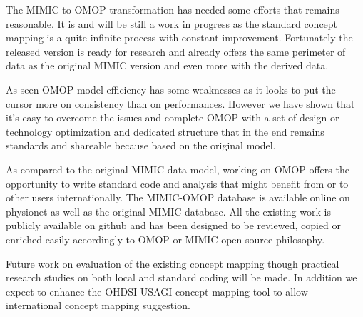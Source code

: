 The MIMIC to OMOP transformation has needed some efforts that remains
reasonable. It is and will be still a work in progress as the standard concept
mapping is a quite infinite process with constant improvement. Fortunately the
released version is ready for research and already offers the same perimeter of
data as the original MIMIC version and even more with the derived data.

As seen OMOP model efficiency has some weaknesses as it looks to put the cursor
more on consistency than on performances. However we have shown that it's easy
to overcome the issues and complete OMOP with a set of design or technology
optimization and dedicated structure that in the end remains standards and
shareable because based on the original model.

As compared to the original MIMIC data model, working on OMOP offers the
opportunity to write standard code and analysis that might benefit from or to
other users internationally. The MIMIC-OMOP database is available online on
physionet as well as the original MIMIC database. All the existing work is
publicly available on github and has been designed to be reviewed, copied or
enriched easily accordingly to OMOP or MIMIC open-source philosophy.

Future work on evaluation of the existing concept mapping though practical
research studies on both local and standard coding will be made. In addition we
expect to enhance the OHDSI USAGI concept mapping tool to allow international
concept mapping suggestion.
